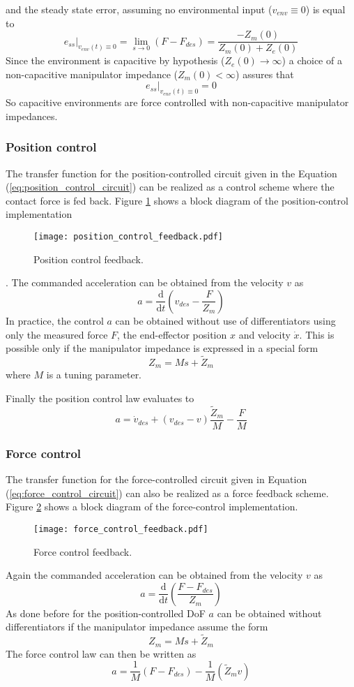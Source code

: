 and the steady state error, assuming no environmental input ($v_{env} \equiv 0$) is equal to 
\[
e_{ss} \Big|_{v_{env}(t) \equiv 0} = \lim_{s \to 0}(F - F_{des}) = \frac{-Z_m(0)}{Z_m(0) + Z_e(0)}
\]
Since the environment is capacitive by hypothesis ($Z_e(0) \rightarrow \infty$) a choice of a
non-capacitive manipulator impedance ($Z_m(0) < \infty$) assures that
\[
e_{ss} \Big|_{v_{env}(t) \equiv 0} = 0
\]
So capacitive environments are force controlled with non-capacitive manipulator impedances.

\subsubsection{Position control}
The transfer function for the position-controlled circuit given in the Equation
(\ref{eq:position_control_circuit}) can be realized as a control scheme where the contact force is fed back.
Figure \ref{fig:position_control_feedback} shows a block diagram of the position-control implementation
\begin{figure}[h]
  \centering
  \texttt{[image: position\_control\_feedback.pdf]}
  \caption{Position control feedback. \label{fig:position_control_feedback}}
\end{figure}.
The commanded acceleration can be obtained from the velocity $v$ as
\[
a = \frac{\mathrm{d}}{\mathrm{d}t} \left(v_{des} - \frac{F}{Z_m}\right)
\]
In practice, the control $a$ can be obtained without use of differentiators
using only the measured force $F$, the end-effector position $x$ and velocity $\dot{x}$.
This is possible only if the manipulator impedance is expressed in a special form
\[
Z_m = Ms + \tilde{Z}_{m}
\]
where $M$ is a tuning parameter.
\par
Finally the position control law evaluates to
\begin{equation}
  \label{eq:position_law}
  a = \dot{v}_{des} + (v_{des} - v)\frac{\tilde{Z}_m}{M} - \frac{F}{M}
\end{equation}

\subsubsection{Force control}
The transfer function for the force-controlled circuit given in Equation (\ref{eq:force_control_circuit})
can also be realized as a force feedback scheme.
Figure \ref{fig:force_control_feedback} shows a block diagram of the force-control implementation.
\begin{figure}[h]
  \centering
  \texttt{[image: force\_control\_feedback.pdf]}
  \caption{Force control feedback. \label{fig:force_control_feedback}}
\end{figure}
Again the commanded acceleration can be obtained from the velocity $v$ as
\[
a = \frac{\mathrm{d}}{\mathrm{d}t} \left(\frac{F - F_{des}}{Z_m} \right)
\]
As done before for the position-controlled DoF $a$ can be obtained without differentiators if
the manipulator impedance assume the form
\[
Z_m = Ms + \tilde{Z}_{m}
\]
The force control law can then be written as
\begin{equation}
  \label{eq:force_law}
  a = \frac{1}{M} (F - F_{des}) - \frac{1}{M}( \tilde{Z}_m v)
\end{equation}

